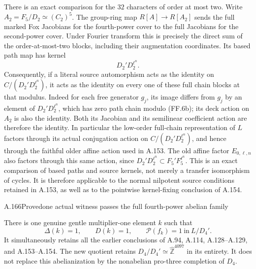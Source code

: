There is an exact comparison for the $32$ characters of
order at most two. Write $A_2=F_5/D_2\simeq(C_2)^5$.
The group-ring map $R[A]\to R[A_2]$ sends the full
marked Fox Jacobians for the fourth-power cover to the
full Jacobians for the second-power cover. Under Fourier
transform this is precisely the direct sum of the
order-at-most-two blocks, including their augmentation
coordinates. Its based path map has kernel
\[
                         D_2'D_2^{\ell^n}.
 \tag{FF.6b}
\]
Consequently, if a literal source automorphism acts as the
identity on $C/(D_2'D_2^{\ell^n})$, it acts as the identity
on every one of these full chain blocks at that modulus.
Indeed for each free generator $g_j$, its image differs
from $g_j$ by an element of $D_2'D_2^{\ell^n}$,
which has zero path chain modulo (FF.6b); its deck action
on $A_2$ is also the identity. Both its Jacobian and its
semilinear coefficient action are therefore the identity.
In particular the low-order full-chain representation of
$L$ factors through its actual conjugation action on
$C/(D_2'D_2^{\ell^n})$, and hence through the faithful
older affine action used in A.153. The old affine factor
$E_{0,\ell,n}$ also factors
through this same action, since
$D_2'D_2^{\ell^n}\subset F_5'F_5^{\ell^n}$.
This is an exact comparison of based paths and source
kernels, not merely a transfer isomorphism of cycles.
It is therefore applicable to the normal nilpotent source
conditions retained in A.153, as well as to the pointwise
kernel-fixing conclusion of A.154.

\begin{statement}{A.166}{Proved}{one actual witness passes the full fourth-power abelian family}
\end{statement}
There is one genuine gentle multiplier-one element $k$ such
that
\[
 \boxed{\quad \Delta(k)=1,\qquad D(k)=1,\qquad
       \mathcal P(f_k)=1\ \text{in}\ L/D_4'.\quad}
 \tag{FF.7a}
\]
It simultaneously retains all the earlier conclusions of
A.94, A.114, A.128--A.129, and A.153--A.154. The new quotient
retains $D_4/D_4'\simeq\widehat{\mathbb Z}^{4097}$ in its
entirety. It does not replace this abelianization by the
nonabelian pro-three completion of $D_4$.

